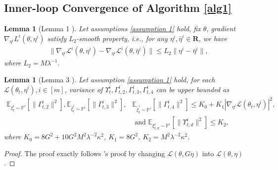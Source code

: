 \documentclass[twoside]{article} %
\theoremstyle{plain}
\newtheorem{lemma}[theorem]{Lemma}
\theoremstyle{definition}
\theoremstyle{remark}
\newcommand{\fL}{\mathcal{L}}
\begin{document}
\subsection{Inner-loop Convergence of Algorithm \ref{alg1}}\label{Appendix: Proof of inner loop}
\begin{lemma}[Lemma 1 \citep{qirevistfDRO}]
Let assumptions \ref{assumption 1} hold, fix $\theta$, gradient $\nabla_{\eta^i}L^i(\theta,\eta^i)$ satisfy $L_2$-smooth property, i.e., for any $\eta^i,\bar{\eta}^{i}\in \mathbf{R}$, we have
\begin{align}
    \|\nabla_{\eta^i}\fL^i(\theta,\eta^i) - \nabla_{\eta^i}\fL^i(\theta,\bar{\eta}^i) \|\leq L_2\|\eta^i-\bar{\eta}^i\|,
\end{align}
where $L_2 = M\lambda^{-1}$.
\end{lemma}
\begin{lemma}[Lemma 3 \citep{qirevistfDRO}]
Let assumption \ref{assumption 1} hold, for each $\fL(\theta_t,\eta^i),i\in[m]$, variance of $\Upsilon_t^i, \Gamma^i_{t,2},\Gamma^i_{t,3},\Gamma^i_{t,4}$ can be upper bounded as
\begin{align}
    \mathbb{E}_{{\xi}^{i}_{t}\sim \mathbb{P}^i}[\|\Gamma^{i}_{t,2} \|^2], \mathbb{E}_{\bar{\xi}^{i}_{t}\sim \mathbb{P}^i}[\|\Gamma^{i}_{t,3} \|^2], &\mathbb{E}_{\tilde{\xi}^{i}_{t}\sim \mathbb{P}^i}[\|\Gamma^{i}_{t,4} \|^2] \leq K_0+K_1|\nabla_{\eta^i}\fL({\theta}_t,\eta^i)|^2, \nonumber \\
    &\text{ and }\mathbb{E}_{\xi^{i}_{t,d}\sim \mathbb{P}^i}[\|\Upsilon_{t,d}^{i} \|^2 ]\leq K_2,
    \label{eq: variance bound}
\end{align}
where $K_0=8G^2+10G^2M^2\lambda^{-2}\kappa^2$, $K_1 = 8G^2$, $K_2 = M^2 \lambda^{-2} \kappa^2$.
\end{lemma}
\begin{proof}
    The proof exactly follows \citet{qirevistfDRO}'s proof by changing $\fL(\theta,G\eta)$ into $\fL(\theta,\eta)$.
\end{proof}
\end{document}
